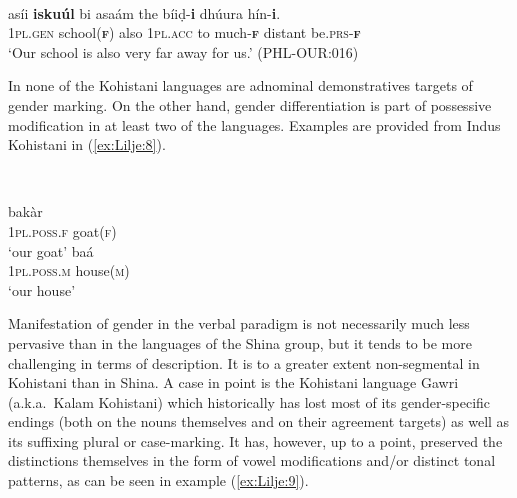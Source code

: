 \documentclass[output=collectionpaper]{langsci/langscibook}
\begin{document}
\ea
\label{ex:Lilje:7}
\\
\gll asíi \textbf{iskuúl} bi asaám the bíiḍ-\textbf{i} dhúura hín-\textbf{i}.\\
\textsc{1pl.gen} school(\textbf{\textsc{f}}) also \textsc{1pl.acc} to much-\textbf{\textsc{f}} distant be.\textsc{prs-}\textbf{\textsc{f}}\\
\glt `Our school is also very far away for us.' (PHL-OUR:016)\\
\z

In none of the Kohistani languages are adnominal demonstratives targets of gender marking. On the other hand, gender differentiation is part of possessive modification in at least two of the languages. Examples are provided from Indus Kohistani in (\ref{ex:Lilje:8}).

\ea
\label{ex:Lilje:8}
\\
\begin{xlist}
\ex
{} bakàr\\
\textsc{1pl.poss.f} goat(\textsc{f}) \\
\glt `our goat'
\ex
{} baá\\
\textsc{1pl.poss.m} house(\textsc{m})\\
\glt `our house'\\
\end{xlist}
\z

Manifestation of gender in the verbal paradigm is not necessarily much less pervasive than in the languages of the Shina group, but it tends to be more challenging in terms of description. It is to a greater extent non-segmental in Kohistani than in Shina. A case in point is the Kohistani language Gawri (a.k.a.\ Kalam Kohistani) which historically has lost most of its gender-specific endings (both on the nouns themselves and on their agreement targets) as well as its suffixing plural or case-marking. It has, however, up to a point, preserved the distinctions themselves in the form of vowel modifications and/or distinct tonal patterns, as can be seen in example (\ref{ex:Lilje:9}).
\end{document}
